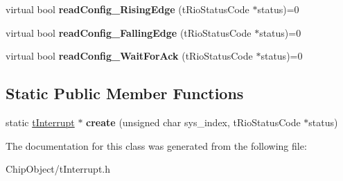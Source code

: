\begin{DoxyCompactItemize}
\item 
\hypertarget{classnFPGA_1_1nFRC__2012__1__6__4_1_1tInterrupt_a57dce5d084b9355fdc165af51b6fe3b4}{
virtual bool {\bfseries readConfig\_\-RisingEdge} (tRioStatusCode $\ast$status)=0}
\label{classnFPGA_1_1nFRC__2012__1__6__4_1_1tInterrupt_a57dce5d084b9355fdc165af51b6fe3b4}

\item 
\hypertarget{classnFPGA_1_1nFRC__2012__1__6__4_1_1tInterrupt_a3dc0870832a706655d2d037e7c81ce08}{
virtual bool {\bfseries readConfig\_\-FallingEdge} (tRioStatusCode $\ast$status)=0}
\label{classnFPGA_1_1nFRC__2012__1__6__4_1_1tInterrupt_a3dc0870832a706655d2d037e7c81ce08}

\item 
\hypertarget{classnFPGA_1_1nFRC__2012__1__6__4_1_1tInterrupt_a75d691ef050c533c0caaf1909fea2cc1}{
virtual bool {\bfseries readConfig\_\-WaitForAck} (tRioStatusCode $\ast$status)=0}
\label{classnFPGA_1_1nFRC__2012__1__6__4_1_1tInterrupt_a75d691ef050c533c0caaf1909fea2cc1}

\end{DoxyCompactItemize}
\subsection*{Static Public Member Functions}
\begin{DoxyCompactItemize}
\item 
\hypertarget{classnFPGA_1_1nFRC__2012__1__6__4_1_1tInterrupt_adc59e88de67f82b51aa6d8fe9d0f62c8}{
static \hyperlink{classnFPGA_1_1nFRC__2012__1__6__4_1_1tInterrupt}{tInterrupt} $\ast$ {\bfseries create} (unsigned char sys\_\-index, tRioStatusCode $\ast$status)}
\label{classnFPGA_1_1nFRC__2012__1__6__4_1_1tInterrupt_adc59e88de67f82b51aa6d8fe9d0f62c8}

\end{DoxyCompactItemize}


The documentation for this class was generated from the following file:\begin{DoxyCompactItemize}
\item 
ChipObject/tInterrupt.h\end{DoxyCompactItemize}
